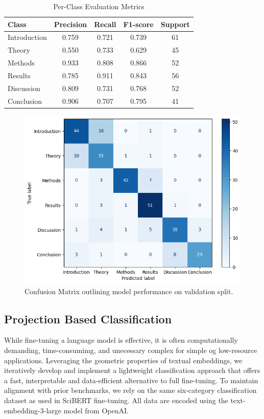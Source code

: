 \begin{table}[ht]
\centering
\caption{Per-Class Evaluation Metrics}
\begin{tabular}{lcccc}
\toprule
\textbf{Class} & \textbf{Precision} & \textbf{Recall} & \textbf{F1-score} & \textbf{Support} \\
\midrule
Introduction          & 0.759 & 0.721 & 0.739 & 61 \\
Theory                & 0.550 & 0.733 & 0.629 & 45 \\
Methods               & 0.933 & 0.808 & 0.866 & 52 \\
Results               & 0.785 & 0.911 & 0.843 & 56 \\
Discussion            & 0.809 & 0.731 & 0.768 & 52 \\
Conclusion            & 0.906 & 0.707 & 0.795 & 41 \\
\bottomrule
\end{tabular}
\label{tab:104}
\end{table}

\begin{figure}%
    \centering
    \includegraphics[width=.6\linewidth]{media/transformer_confusion_matrix.png}
    \caption{Confusion Matrix outlining model performance on validation split.}
    \label{fig:101}
\end{figure}

\subsection{Projection Based Classification}
While fine-tuning a language model is effective, it is often computationally demanding, time-consumimg, and unecessary complex for simple og low-resource applications. Leveraging the geometric properties of textual embeddings, we iteratively develop and implement a lightweight classification approach that offers a fast, interpretable and data-efficient alternative to full fine-tuning. To maintain alignment with prior benchmarks, we rely on the same six-category classification dataset as used in SciBERT fine-tuning. All data are encoded using the text-embedding-3-large model from OpenAI.

